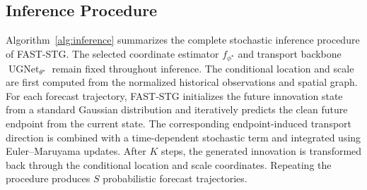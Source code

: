 \documentclass[sigconf, anonymous, review]{acmart}
\begin{document}
\subsection{Inference Procedure}
\label{app:inference_procedure}

Algorithm~\ref{alg:inference} summarizes the complete stochastic
inference procedure of FAST-STG. The selected coordinate estimator
$f_{\phi^{\star}}$ and transport backbone
$\operatorname{UGNet}_{\theta^{\star}}$ remain fixed throughout
inference. The conditional location and scale are first computed from
the normalized historical observations and spatial graph. For each
forecast trajectory, FAST-STG initializes the future innovation state
from a standard Gaussian distribution and iteratively predicts the
clean future endpoint from the current state. The corresponding
endpoint-induced transport direction is combined with a time-dependent
stochastic term and integrated using Euler--Maruyama updates. After
$K$ steps, the generated innovation is transformed back through the
conditional location and scale coordinates. Repeating the procedure
produces $S$ probabilistic forecast trajectories.
\end{document}
